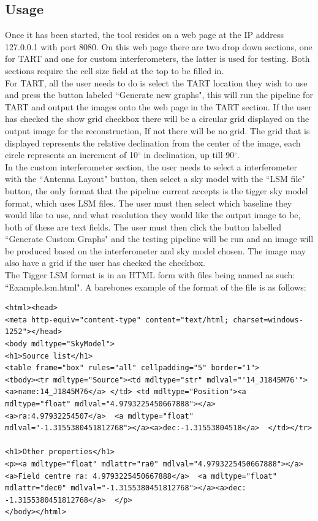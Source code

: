 \subsection{Usage}
Once it has been started, the tool resides on a web page at the IP address 127.0.0.1 with port 8080. On this web page there are two drop down sections, one for TART and one for custom interferometers, the latter is used for testing. Both sections require the cell size field at the top to be filled in.
\\For TART, all the user needs to do is select the TART location they wish to use and press the button labeled ``Generate new graphs", this will run the pipeline for TART and output the images onto the web page in the TART section. If the user has checked the show grid checkbox there will be a circular grid displayed on the output image for the reconstruction, If not there will be no grid. The grid that is displayed represents the relative declination from the center of the image, each circle represents an increment of 10$^\circ$ in declination, up till 90$^\circ$. 
\\In the custom interferometer section, the user needs to select a interferometer with the ``Antenna Layout" button, then select a sky model with the ``LSM file" button, the only format that the pipeline current accepts is the tigger sky model format, which uses LSM\cite{TiggerGuide}\cite{TiggerPYPI} files. The user must then select which baseline they would like to use, and what resolution they would like the output image to be, both of these are text fields. The user must then click the button labelled ``Generate Custom Graphs" and the testing pipeline will be run and an image will be produced based on the interferometer and sky model chosen. The image may also have a grid if the user has checked the checkbox.
\\The Tigger LSM format is in an HTML form with files being named as such: ``Example.lsm.html". A barebones example of the format of the file is as follows: \\
\begin{lstlisting}
<html><head>
<meta http-equiv="content-type" content="text/html; charset=windows-1252"></head>
<body mdltype="SkyModel">
<h1>Source list</h1>
<table frame="box" rules="all" cellpadding="5" border="1">
<tbody><tr mdltype="Source"><td mdltype="str" mdlval="'14_J1845M76'"><a>name:14_J1845M76</a> </td> <td mdltype="Position"><a mdltype="float" mdlval="4.9793225450667888"></a><a>ra:4.97932254507</a>  <a mdltype="float" mdlval="-1.3155380451812768"></a><a>dec:-1.31553804518</a>  </td></tr>

<h1>Other properties</h1>
<p><a mdltype="float" mdlattr="ra0" mdlval="4.9793225450667888"></a><a>Field centre ra: 4.9793225450667888</a>  <a mdltype="float" mdlattr="dec0" mdlval="-1.3155380451812768"></a><a>dec: -1.3155380451812768</a>  </p>
</body></html>
\end{lstlisting}